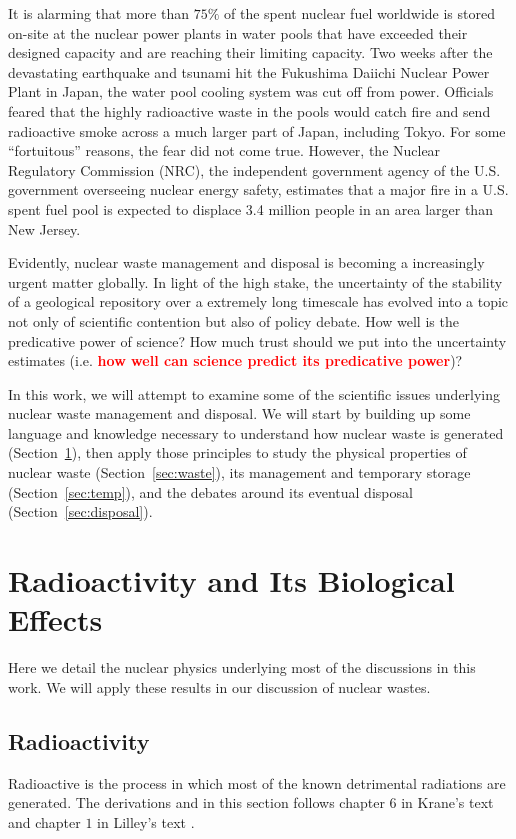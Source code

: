 \documentclass[nofootinbib,preprint,aps]{revtex4-1}
\newcommand{\red}[1]{\textcolor{red}{\bf #1}}
\begin{document}
It is alarming that more than $75\%$ of the spent nuclear fuel worldwide is stored on-site at the nuclear power plants
in water pools that have exceeded their designed capacity and are reaching their limiting capacity.\cite{aa12}
Two weeks after the devastating earthquake and tsunami hit the Fukushima Daiichi Nuclear Power Plant in Japan,
the water pool cooling system was cut off from power. Officials feared that
the highly radioactive waste in the pools would catch fire and send radioactive smoke
across a much larger part of Japan, including Tokyo.\cite{s16} For some ``fortuitous'' reasons, the fear did not come true.
However, the Nuclear Regulatory Commission (NRC), the independent government agency
of the U.S. government overseeing nuclear energy safety,
estimates that a major fire in a U.S. spent fuel pool is expected to
displace 3.4 million people in an area larger than New Jersey.\cite{s16}

Evidently, nuclear waste management and disposal is becoming a increasingly urgent matter globally.
In light of the high stake,
the uncertainty of the stability of a geological repository over a extremely long timescale has evolved into 
a topic not only of scientific contention but also of policy debate.
How well is the predicative power of science? How much trust should we put into the uncertainty estimates
(i.e. \red{how well can science predict its predicative power})?

In this work, we will attempt to examine some of the scientific issues underlying nuclear waste management
and disposal. We will start by building up some
language and knowledge necessary to understand how nuclear waste is generated (Section~\ref{sec:phys}),
then apply those principles to study
the physical properties of nuclear waste (Section~\ref{sec:waste}), its management and temporary storage
(Section~\ref{sec:temp}), and the debates around its eventual disposal (Section~\ref{sec:disposal}).

\section{Radioactivity and Its Biological Effects}
\label{sec:phys}
    Here we detail the nuclear physics underlying most of the discussions
    in this work. We will apply these results in our discussion of nuclear wastes.
    \subsection{Radioactivity}
    Radioactive is the process in which most of the known detrimental radiations are generated.
    The derivations and in this section follows chapter $6$ in
    Krane's text \cite{k88} and chapter $1$ in Lilley's text \cite{l01}.
\end{document}
